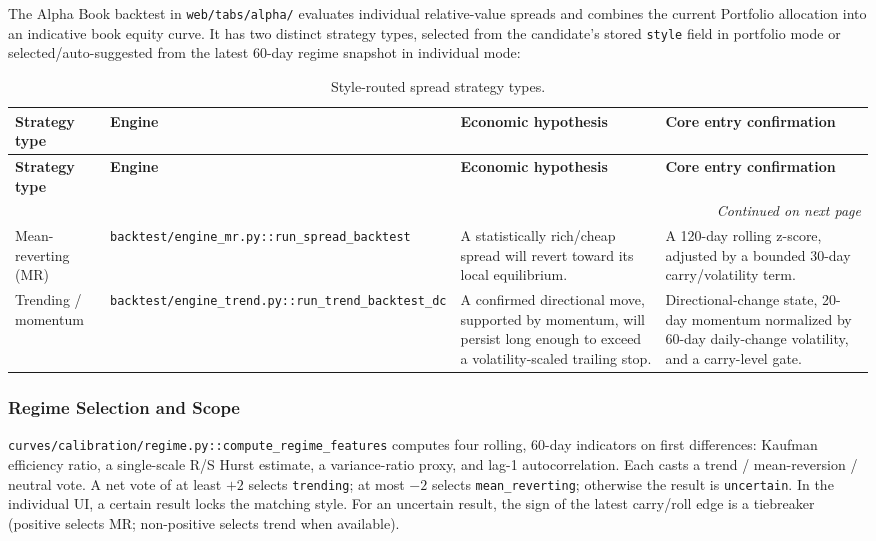 The Alpha Book backtest in \texttt{web/tabs/alpha/} evaluates individual relative-value
spreads and combines the current Portfolio allocation into an indicative book
equity curve. It has two distinct strategy types, selected from the candidate's
stored \texttt{style} field in portfolio mode or selected/auto-suggested from the latest
60-day regime snapshot in individual mode:

{\small
\setlength{\LTleft}{0pt}
\setlength{\LTright}{0pt}
\setlength{\tabcolsep}{5pt}
\renewcommand{\arraystretch}{1.15}
\begin{longtable}{p{} p{} p{} p{}}
\caption{Style-routed spread strategy types.}\label{tab:pairs-strategy-types-overleaf} \\
\toprule
\textbf{Strategy type} & \textbf{Engine} & \textbf{Economic hypothesis} & \textbf{Core entry confirmation} \\
\midrule
\endfirsthead
\toprule
\textbf{Strategy type} & \textbf{Engine} & \textbf{Economic hypothesis} & \textbf{Core entry confirmation} \\
\midrule
\endhead
\midrule
\multicolumn{4}{r}{\textit{Continued on next page}} \\
\midrule
\endfoot
\bottomrule
\endlastfoot
Mean-reverting (MR) & \texttt{backtest/engine\_mr.py::run\_spread\_backtest} & A statistically rich/cheap spread will revert toward its local equilibrium. & A 120-day rolling z-score, adjusted by a bounded 30-day carry/volatility term. \\
Trending / momentum & \texttt{backtest/engine\_trend.py::run\_trend\_backtest\_dc} & A confirmed directional move, supported by momentum, will persist long enough to exceed a volatility-scaled trailing stop. & Directional-change state, 20-day momentum normalized by 60-day daily-change volatility, and a carry-level gate. \\
\end{longtable}
}

\subsubsection{Regime Selection and Scope}

\texttt{curves/calibration/regime.py::compute\_regime\_features} computes four rolling,
60-day indicators on first differences: Kaufman efficiency ratio, a single-scale
R/S Hurst estimate, a variance-ratio proxy, and lag-1 autocorrelation. Each casts a
trend / mean-reversion / neutral vote. A net vote of at least $+2$ selects
\texttt{trending}; at most $-2$ selects \texttt{mean\_reverting}; otherwise the result is
\texttt{uncertain}. In the individual UI, a certain result locks the matching style. For
an uncertain result, the sign of the latest carry/roll edge is a tiebreaker
(positive selects MR; non-positive selects trend when available).

